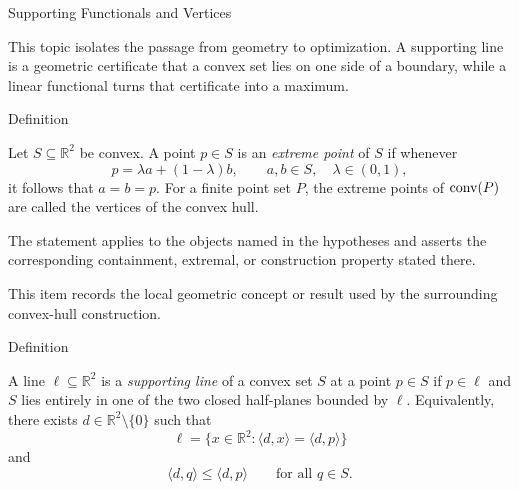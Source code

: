 \begin{topicbox}{Supporting Functionals and Vertices}
\begin{exposition}
This topic isolates the passage from geometry to optimization. A supporting
line is a geometric certificate that a convex set lies on one side of a
boundary, while a linear functional turns that certificate into a maximum.
\end{exposition}

\begin{definitionbox}{Definition}
\begin{definition}
\label{def:computational-geometry-extreme-point}
Let \(S\subseteq\mathbb{R}^2\) be convex. A point \(p\in S\) is an
\emph{extreme point} of \(S\) if whenever
\[
  p=\lambda a+(1-\lambda)b,
  \qquad
  a,b\in S,\quad \lambda\in(0,1),
\]
it follows that \(a=b=p\). For a finite point set \(P\), the extreme points of
\(\operatorname{conv}(P)\) are called the vertices of the convex hull.
\end{definition}
\end{definitionbox}

\begin{remark*}
The statement applies to the objects named in the hypotheses and asserts the
corresponding containment, extremal, or construction property stated there.
\end{remark*}

\begin{remark*}[Interpretation]
This item records the local geometric concept or result used by the surrounding
convex-hull construction.
\end{remark*}

\DefinitionalRoot

\begin{definitionbox}{Definition}
\begin{definition}
\label{def:computational-geometry-supporting-line}
A line \(\ell\subseteq\mathbb{R}^2\) is a \emph{supporting line} of a convex set
\(S\) at a point \(p\in S\) if \(p\in\ell\) and \(S\) lies entirely in one of the
two closed half-planes bounded by \(\ell\). Equivalently, there exists
\(d\in\mathbb{R}^2\setminus\{0\}\) such that
\[
  \ell=\{x\in\mathbb{R}^2:\langle d,x\rangle=\langle d,p\rangle\}
\]
and
\[
  \langle d,q\rangle\le \langle d,p\rangle
  \qquad
  \text{for all } q\in S.
\]
\end{definition}
\end{definitionbox}


\end{topicbox}
